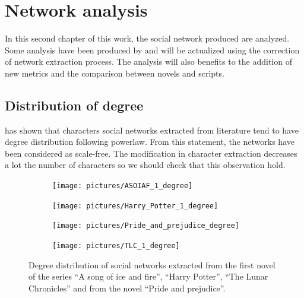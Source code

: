 \documentclass[a4paper, 12pt]{report}
\begin{document}
\chapter{Network analysis}
In this second chapter of this work, the social network produced are analyzed. Some analysis have been produced by \cite{original} and will be actualized using the correction of network extraction process. The analysis will also benefits to the addition of new metrics and the comparison between novels and scripts.

\section{Distribution of degree}
\cite{original} has shown that characters social networks extracted from literature tend to have degree distribution following powerlaw. From this statement, the networks have been considered as scale-free. The modification in character extraction decreases a lot the number of characters so we should check that this observation hold.

\begin{figure}
\label{distrib_degree_4_novels}
\begin{subfigure}{.24\textwidth}
\centering
\texttt{[image: pictures/ASOIAF\_1\_degree]}
\end{subfigure}
\hfill
\begin{subfigure}{.24\textwidth}
\centering
\texttt{[image: pictures/Harry\_Potter\_1\_degree]}
\end{subfigure}
\hfill
\begin{subfigure}{.24\textwidth}
\centering
\texttt{[image: pictures/Pride\_and\_prejudice\_degree]}
\end{subfigure}
\begin{subfigure}{.24\textwidth}
\centering
\texttt{[image: pictures/TLC\_1\_degree]}
\end{subfigure}
\caption{Degree distribution of social networks extracted from the first novel of the series ``A song of ice and fire'', ``Harry Potter'', ``The Lunar Chronicles'' and from  the novel ``Pride and prejudice''.}
\end{figure}
\end{document}
